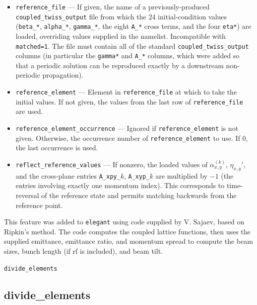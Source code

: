 \documentclass[11pt]{article}
\begin{document}
\begin{itemize}
\item \verb|reference_file| --- If given, the name of a previously-produced
  \verb|coupled_twiss_output| file from which the 24 initial-condition values
  (\verb|beta_*|, \verb|alpha_*|, \verb|gamma_*|, the eight \verb|A_*| cross terms, and the four
  \verb|eta*|) are loaded, overriding values supplied in the namelist.  Incompatible with
  \verb|matched=1|.  The file must contain all of the standard \verb|coupled_twiss_output|
  columns (in particular the \verb|gamma*| and \verb|A_*| columns, which were added so that a
  periodic solution can be reproduced exactly by a downstream non-periodic propagation).
\item \verb|reference_element| --- Element in \verb|reference_file| at which to take the initial
  values.  If not given, the values from the last row of \verb|reference_file| are used.
\item \verb|reference_element_occurrence| --- Ignored if \verb|reference_element| is not given.
  Otherwise, the occurrence number of \verb|reference_element| to use.  If 0, the last
  occurrence is used.
\item \verb|reflect_reference_values| --- If nonzero, the loaded values of $\alpha_{x,y}^{(k)}$,
  $\eta_{x,y}'$, and the cross-plane entries \verb|A_xpy_|$k$, \verb|A_xyp_|$k$ are multiplied by
  $-1$ (the entries involving exactly one momentum index).  This corresponds to time-reversal of
  the reference state and permits matching backwards from the reference point.
\end{itemize}

This feature was added to {\tt elegant} using code supplied by V. Sajaev, based on Ripkin's method.
The code computes the coupled lattice functions, then uses the supplied emittance, emittance ratio,
and momentum spread to compute the beam sizes, bunch length (if rf is included), and beam tilt.

\newpage
\begin{center}{\Large\verb|divide_elements|}\end{center}
\subsection{divide\_elements \label{subsec:divideelements}}
\end{document}

